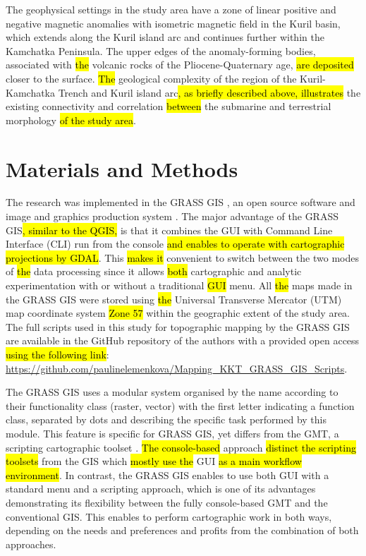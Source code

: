 \documentclass[technologies,article,submit,pdftex,moreauthors]{Definitions/mdpi}
\begin{document}
The geophysical settings in the study area have a zone of linear positive and negative magnetic anomalies with isometric magnetic field in the Kuril basin, which extends along the Kuril island arc and continues further within the Kamchatka Peninsula. The upper edges of the anomaly-forming bodies, associated with \hl{the }volcanic rocks of the Pliocene-Quaternary age, \hl{are deposited} closer to the surface. \hl{The} geological complexity of the region of the Kuril-Kamchatka Trench and Kuril island arc\hl{, as briefly described above, illustrates} the existing connectivity and correlation \hl{between} the submarine and terrestrial morphology \hl{of the study area}. 

\section{Materials and Methods}

The research was implemented in the GRASS GIS \cite{NetelerMitasova2008}, an open source\hl{ }software and image and graphics production system \cite{Neteleretal2008,Neteler2000}. The major advantage of the GRASS GIS\hl{, similar to the QGIS,} is that it combines the GUI with Command Line Interface (CLI) run from the console\hl{ and enables to operate with cartographic projections by GDAL}. This \hl{makes it} convenient to switch between the two modes of \hl{the} data processing since it allows \hl{both }cartographic and analytic experimentation with or without a traditional \hl{GUI }menu. All \hl{the} maps made in the GRASS GIS were stored using \hl{the} Universal Transverse Mercator (UTM) map coordinate system \hl{Zone 57} within the geographic extent of the study area. The full scripts used in this study for topographic mapping by the GRASS GIS are available in the GitHub repository of the authors with a provided open access \hl{using the following link}: \href{https://github.com/paulinelemenkova/Mapping_KKT_GRASS_GIS_Scripts}{https://github.com/paulinelemenkova/Mapping\_KKT\_GRASS\_GIS\_Scripts}.

The GRASS GIS uses a modular system organised by the name according to their functionality class (raster, vector) with the first letter indicating a function class, separated by dots and describing the specific task performed by this module. This feature is specific for GRASS GIS, yet differs from the GMT, a scripting cartographic toolset \cite{Wesseletal2019}. \hl{The console-based }approach \hl{distinct the scripting toolsets} from the GIS which \hl{mostly use the} GUI \hl{as a main workflow environment}. In contrast, the GRASS GIS enables to use both GUI with a standard menu and a scripting approach, which is one of its advantages demonstrating its flexibility between the fully console-based GMT and the conventional GIS. This enables to perform cartographic work in both ways, depending on the needs and preferences and profits from the combination of both approaches. 
\end{document}

